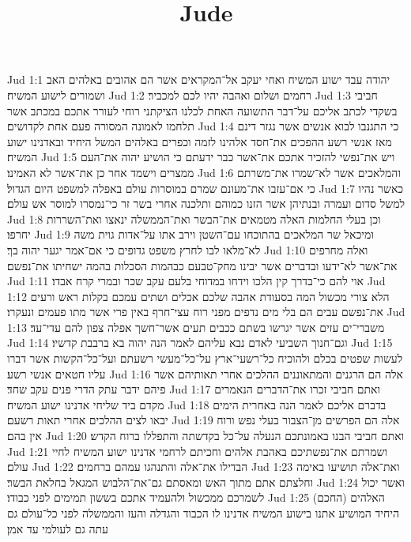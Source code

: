 

\title{Jude}

Jud 1:1  יהודה עבד ישוע המשיח ואחי יעקב אל־המקראים אשר הם אהובים באלהים האב ושמורים לישוע המשיח׃
Jud 1:2  רחמים ושלום ואהבה יהיו לכם למכביר׃
Jud 1:3  חביבי בשקדי לכתב אליכם על־דבר התשועה האחת לכלנו הציקתני רוחי לעורר אתכם במכתב אשר תלחמו לאמונה המסורה פעם אחת לקדושים׃
Jud 1:4  כי התגנבו לבוא אנשים אשר נגזר דינם מאז אנשי רשע ההפכים את־חסד אלהינו לזמה וכפרים באלהים המשל היחיד ובאדנינו ישוע המשיח׃
Jud 1:5  ויש את־נפשי להזכיר אתכם את־אשר כבר ידעתם כי הושיע יהוה את־העם ממצרים וישמד אחר כן את־אשר לא האמינו׃
Jud 1:6  והמלאכים אשר לא־שמרו את־משרתם כי אם־עזבו את־מעונם שמרם במוסרות עולם באפלה למשפט היום הגדול׃
Jud 1:7  כאשר נהיו למשל סדום ועמרה ובנתיהן אשר הזנו כמוהם ותלכנה אחרי בשר זר כי־נמסרו למוסר אש עולם׃
Jud 1:8  וכן בעלי החלמות האלה מטמאים את־הבשר ואת־הממשלה ינאצו ואת־השררות יחרפו׃
Jud 1:9  ומיכאל שר המלאכים בהתוכחו עם־השטן וירב אתו על־אדות גוית משה לא־מלאו לבו לחרץ משפט גדופים כי אם־אמר יגער יהוה בך׃
Jud 1:10  ואלה מחרפים את־אשר לא־ידעו ובדברים אשר יבינו מחק־טבעם כבהמות הסכלות בהמה ישחיתו את־נפשם׃
Jud 1:11  אוי להם כי־בדרך קין הלכו וידחו במדוחי בלעם עקב שכר ובמרי קרח אבדו׃
Jud 1:12  הלא צורי מכשול המה בסעודת אהבה שלכם אכלים ושתים עמכם בקלות ראש ורעים את־נפשם עבים הם בלי מים נדפים מפני רוח עצי־חרף באין פרי אשר מתו פעמים ונעקרו׃
Jud 1:13  משברי־ים עזים אשר יגרשו בשתם ככבים תעים אשר־חשך אפלה צפון להם עדי־עד׃
Jud 1:14  וגם־חנוך השביעי לאדם נבא עליהם לאמר הנה יהוה בא ברבבת קדשיו׃
Jud 1:15  לעשות שפטים בכלם ולהוכיח כל־רשעי־ארץ על־כל־מעשי רשעתם ועל־כל־הקשות אשר דברו עליו חטאים אנשי רשע׃
Jud 1:16  אלה הם הרגנים והמתאוננים ההלכים אחרי תאותיהם אשר פיהם ידבר עתק הדרי פנים עקב שחד׃
Jud 1:17  ואתם חביבי זכרו את־הדברים הנאמרים מקדם ביד שליחי אדנינו ישוע המשיח׃
Jud 1:18  בדברם אליכם לאמר הנה באחרית הימים יבאו לצים ההלכים אחרי תאות רשעם׃
Jud 1:19  אלה הם הפרשים מן־הצבור בעלי נפש ורוח אין בהם׃
Jud 1:20  ואתם חביבי הבנו באמונתכם הנעלה על־כל בקדשתה והתפללו ברוח הקדש׃
Jud 1:21  ושמרתם את־נפשתיכם באהבת אלהים וחכיתם לרחמי אדנינו ישוע המשיח לחיי עולם׃
Jud 1:22  הבדילו את־אלה והתנהגו עמהם ברחמים׃
Jud 1:23  ואת־אלה תושיעו באימה וחלצתם אתם מתוך האש ומאסתם גם־את־הלבוש המגאל בחלאת הבשר׃
Jud 1:24  ואשר יכול לשמרכם ממכשול ולהעמיד אתכם בששון תמימים לפני כבודו׃
Jud 1:25  האלהים (החכם) היחיד המושיע אתנו בישוע המשיח אדנינו לו הכבוד והגדלה והעז והממשלה לפני כל־עולם גם עתה גם לעולמי עד אמן׃


